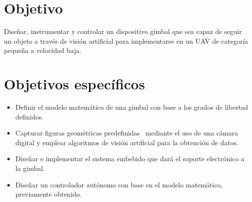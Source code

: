 \section{Objetivo}
Diseñar, instrumentar y controlar un dispositivo gimbal que sea capaz de seguir un objeto a través de visión artificial para
implementarse en un UAV de categoría pequeña a velocidad baja.

\section{Objetivos específicos}
\begin{itemize}
	\item Definir el modelo matemático de una gimbal con base a los grados de libertad definidos.
	\item Capturar figuras geométricas predefinidas  mediante el uso de una cámara digital y emplear algoritmos de visión artificial para la obtención de datos.
	\item Diseñar e implementar el sistema embebido que dará el soporte electrónico a la gimbal.
	\item Diseñar un controlador autónomo con base en el modelo matemático, previamente obtenido.
\end{itemize}

